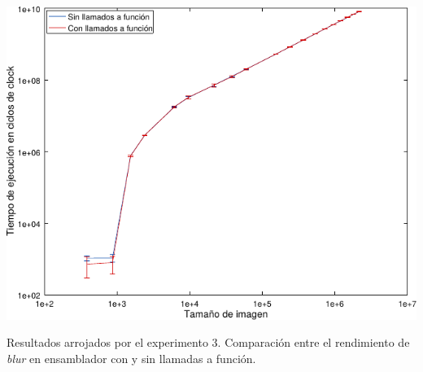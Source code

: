             \noindent{} \begin{minipage}{\textwidth}
                \begin{center}
                    \vspace{1em}
                    \includegraphics{graficos/exp3-blur-asm_vs_asm2.pdf}
                    \vspace{1em}

                    Resultados arrojados por el experimento 3. Comparación entre el rendimiento de \emph{blur} en ensamblador con y sin llamadas a función.
                \end{center}
            \end{minipage}



